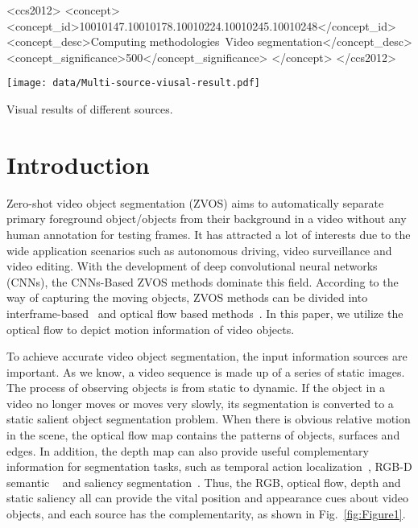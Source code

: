 \documentclass[sigconf]{acmart}
\begin{document}
\begin{CCSXML}
	<ccs2012>
	<concept>
	<concept_id>10010147.10010178.10010224.10010245.10010248</concept_id>
	<concept_desc>Computing methodologies~Video segmentation</concept_desc>
	<concept_significance>500</concept_significance>
	</concept>
	</ccs2012>
\end{CCSXML}


    



\begin{teaserfigure}
  \texttt{[image: data/Multi-source-viusal-result.pdf]}
  \caption{Visual results of different sources. }
  \label{fig:Figure1}
\end{teaserfigure}
\maketitle

\section{Introduction}
Zero-shot video object segmentation (ZVOS) aims to automatically separate primary foreground object/objects from their background in a video without any human annotation for testing frames. It has attracted a lot of interests due to the wide application scenarios such as autonomous driving, video surveillance and video editing.
With the development of deep convolutional neural networks (CNNs), the CNNs-Based
ZVOS methods dominate this field. According to the way of capturing the moving objects, ZVOS methods can be  divided into  interframe-based~\cite{WCS,AGNN,COSNet,AGS,EPO,PDB} and optical flow based methods~\cite{MATNet,GateNet,MP,SFL}. In this paper, we utilize the optical flow to depict motion information of video objects. 

To achieve accurate video object segmentation, the input information sources are important. As we know, a video sequence is made up of a series of static images. The process of observing objects is from static to dynamic. If the object in a video no longer moves or moves very slowly, its segmentation is converted to a static salient object segmentation problem. 
When there is obvious relative motion in the scene, the optical flow map contains the  patterns of objects, surfaces and edges. 
In addition, the depth map can also provide useful complementary information for segmentation tasks, such as temporal action localization~\cite{jiyuan_mm}, RGB-D semantic ~\cite{PA-RGBD-SS,DA-RGBD-SS,SS-RGBD-SS} and  saliency segmentation~\cite{ACM_RGBD_SOD_1,DANet,HDFNet}. 
Thus, the RGB, optical flow, depth and static saliency all can provide the vital position and appearance cues about video objects, and each source has the complementarity, as shown in Fig.~\ref{fig:Figure1}. 
\end{document}
